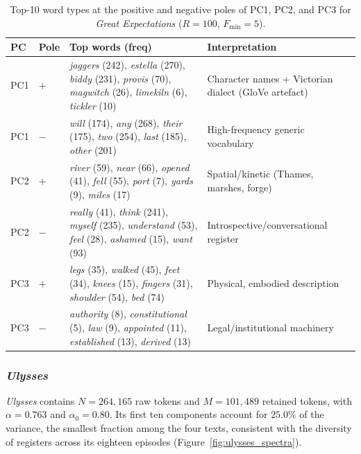 \documentclass[12pt,a4paper]{article}
\begin{document}
\begin{table}[htbp]
\centering
\caption{Top-10 word types at the positive and negative poles
of PC1, PC2, and PC3 for \emph{Great Expectations}
($R=100$, $F_{\min}=5$).}
\label{tab:greatexp_pc}
\small
\setlength{\tabcolsep}{4pt}
\begin{tabular}{ll p{6cm} p{5.5cm}}
\toprule
PC & Pole & Top words (freq) & Interpretation \\
\midrule
PC1 & $+$ &
  \emph{jaggers} (242), \emph{estella} (270), \emph{biddy} (231),
  \emph{provis} (70), \emph{magwitch} (26),
  \emph{limekiln} (6), \emph{tickler} (10)
  & Character names + Victorian dialect (GloVe artefact) \\
PC1 & $-$ &
  \emph{will} (174), \emph{any} (268), \emph{their} (175),
  \emph{two} (254), \emph{last} (185), \emph{other} (201)
  & High-frequency generic vocabulary \\
\midrule
PC2 & $+$ &
  \emph{river} (59), \emph{near} (66), \emph{opened} (41),
  \emph{fell} (55), \emph{port} (7), \emph{yards} (9),
  \emph{miles} (17)
  & Spatial/kinetic (Thames, marshes, forge) \\
PC2 & $-$ &
  \emph{really} (41), \emph{think} (241), \emph{myself} (235),
  \emph{understand} (53), \emph{feel} (28),
  \emph{ashamed} (15), \emph{want} (93)
  & Introspective/conversational register \\
\midrule
PC3 & $+$ &
  \emph{legs} (35), \emph{walked} (45), \emph{feet} (34),
  \emph{knees} (15), \emph{fingers} (31),
  \emph{shoulder} (54), \emph{bed} (74)
  & Physical, embodied description \\
PC3 & $-$ &
  \emph{authority} (8), \emph{constitutional} (5),
  \emph{law} (9), \emph{appointed} (11),
  \emph{established} (13), \emph{derived} (13)
  & Legal/institutional machinery \\
\bottomrule
\end{tabular}
\end{table}

\subsubsection{\emph{Ulysses}}
\label{sec:ulysses}

\emph{Ulysses} contains $N=264{,}165$ raw tokens and $M=101{,}489$
retained tokens, with $\alpha=0.763$ and $\alpha_0=0.80$. Its first
ten components account for $25.0\%$ of the variance, the smallest
fraction among the four texts, consistent with the diversity of
registers across its eighteen episodes
(Figure~\ref{fig:ulysses_spectra}).
\end{document}
